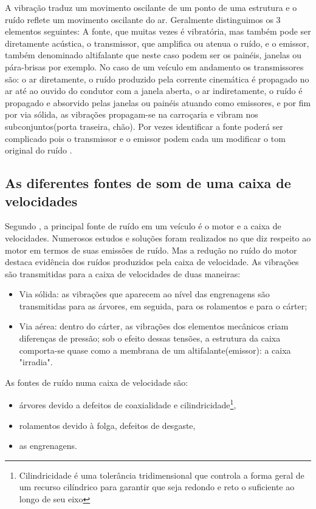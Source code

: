 A vibração traduz um movimento oscilante de um ponto de uma estrutura e o ruído reflete um movimento oscilante do ar. Geralmente distinguimos os 3 elementos seguintes: A fonte, que muitas vezes é vibratória, mas também pode ser diretamente acústica, o transmissor, que amplifica ou atenua o ruído, e o emissor, também denominado altifalante que neste caso podem ser os painéis, janelas ou pára-brisas por exemplo. No caso de um veículo em andamento os transmissores são: o ar diretamente, o ruído produzido pela corrente cinemática é propagado no ar até ao ouvido do condutor com a janela aberta, o ar indiretamente, o ruído é propagado e absorvido pelas janelas ou painéis atuando como emissores, e por fim por via sólida, as vibrações propagam-se na carroçaria e vibram nos subconjuntos(porta traseira, chão). Por vezes identificar a fonte poderá ser complicado pois o transmissor e o emissor podem cada um  modificar o tom original do ruído \cite{bruitChaine}. 
\subsection{As diferentes fontes de som de uma caixa de velocidades}
Segundo \textcite{Grainolement}, a principal fonte de ruído em um veículo é o motor e a caixa de velocidades. Numerosos estudos e soluções foram realizados no que diz respeito ao motor em termos de suas emissões de ruído. Mas a redução no ruído do motor destaca evidência dos ruídos produzidos pela caixa de velocidade. As vibrações são transmitidas para a caixa de velocidades de duas maneiras:
\begin{itemize}
\item Via sólida: as vibrações que aparecem ao nível das engrenagens são
transmitidas para as árvores, em seguida, para os rolamentos e para o cárter;
\item Via aérea: dentro do cárter, as vibrações dos elementos mecânicos criam
diferenças de pressão; sob o efeito dessas tensões, a estrutura da caixa
comporta-se quase como a membrana de um altifalante(emissor): a caixa "irradia".
\end{itemize}
As fontes de ruído numa caixa de velocidade são:
\begin{itemize}
\item árvores devido a defeitos de coaxialidade e cilindricidade\footnote{Cilindricidade é uma tolerância tridimensional que controla a forma geral de um recurso cilíndrico para garantir que seja redondo e reto o suficiente ao longo de seu eixo},
\item rolamentos devido à folga, defeitos de desgaste,
\item as engrenagens.
\end{itemize}

